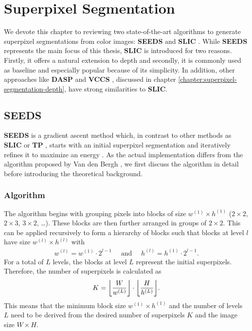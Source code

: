 \chapter{Superpixel Segmentation}
\label{chapter:superpixel-segmentation}

We devote this chapter to reviewing two state-of-the-art algorithms to generate superpixel segmentations from color images: \textbf{SEEDS} \cite{VanDenBerghBoixRoigCapitaniVanGool:2012} and \textbf{SLIC} \cite{AchantaShajiSmithLucchiFuaSuesstrunk:2010}. While \textbf{SEEDS} represents the main focus of this thesis, \textbf{SLIC} is introduced for two reasons. Firstly, it offers a natural extension to depth and secondly, it is commonly used as baseline and especially popular because of its simplicity. In addition, other approaches like \textbf{DASP} \cite{WeikersdorferGossowBeetz:2012} and \textbf{VCCS} \cite{PaponAbramovSchoelerWoergoetter:2013}, discussed in chapter \ref{chapter:superpixel-segmentation-depth}, have strong similarities to \textbf{SLIC}.

\section{SEEDS}
\label{section:superpixel-segmentation-seeds}

\textbf{SEEDS} is a gradient ascent method which, in contrast to other methods as \textbf{SLIC} or \textbf{TP} \cite{LevinshteinStereKutulakosFleetDickinsonSiddiqi:2009}, starts with an initial superpixel segmentation and iteratively refines it to maximize an energy \cite{VanDenBerghBoixRoigCapitaniVanGool:2012}. As the actual implementation differs from the algorithm proposed by Van den Bergh \etal, we first discuss the algorithm in detail before introducing the theoretical background.

\subsection{Algorithm}
\label{subsection:superpixel-segmentation-seeds-algorithm}

The algorithm begins with grouping pixels into blocks of size $w^{(1)} \times h^{(1)}$ (\eg $2 \times 2$, $2 \times 3$, $3 \times 2$, \dots). These blocks are then further arranged in groups of $2 \times 2$. This can be applied recursively to form a hierarchy of blocks such that blocks at level $l$ have size $w^{(l)} \times h^{(l)}$ with
\begin{align}
	w^{(l)} = w^{(1)}\cdot 2^{l-1}\quad\text{ and }\quad h^{(l)} = h^{(1)}\cdot 2^{l-1}.
\end{align}
For a total of $L$ levels, the blocks at level $L$ represent the initial superpixels. Therefore, the number of superpixels is calculated as
\begin{align}
	K = \floor*{\frac{W}{w^{(L)}}} \cdot \floor*{\frac{H}{h^{(L)}}}.
\end{align}
This means that the minimum block size $w^{(1)} \times h^{(1)}$ and the number of levels $L$ need to be derived from the desired number of superpixels $K$ and the image size $W \times H$.

